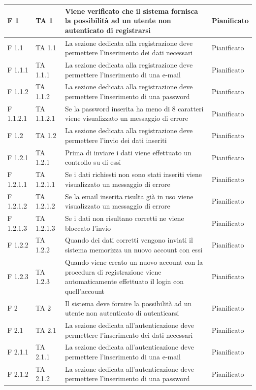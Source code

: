 \documentclass[a4paper,11pt]{article}
\begin{document}
\begin{longtable}{p{}p{}p{}p{}}
F 1 & TA 1& Viene verificato che il sistema fornisca la possibilità ad un utente non autenticato di registrarsi & Pianificato\\
\midrule
F 1.1 &TA 1.1& La sezione dedicata alla registrazione deve permettere l'inserimento dei dati necessari & Pianificato\\
\midrule
F 1.1.1 &TA 1.1.1& La sezione dedicata alla registrazione deve permettere l'inserimento di una e-mail & Pianificato\\
\midrule
F 1.1.2 &TA 1.1.2& La sezione dedicata alla registrazione deve permettere l'inserimento di una password & Pianificato\\
\midrule
F 1.1.2.1 &TA 1.1.2.1& Se la password inserita ha meno di 8 caratteri viene visualizzato un messaggio di errore & Pianificato\\
\midrule
F 1.2 & TA 1.2&La sezione dedicata alla registrazione deve permettere l'invio dei dati inseriti & Pianificato\\
\midrule
F 1.2.1 &TA 1.2.1&Prima di inviare i dati viene effettuato un controllo su di essi & Pianificato\\
\midrule
F 1.2.1.1 & TA 1.2.1.1&Se i dati richiesti non sono stati inseriti viene visualizzato un messaggio di errore & Pianificato\\
\midrule
F 1.2.1.2 &TA 1.2.1.2&Se la email inserita risulta già in uso viene visualizzato un messaggio di errore & Pianificato\\
\midrule
F 1.2.1.3 & TA 1.2.1.3&Se i dati non risultano corretti ne viene bloccato l'invio & Pianificato\\
\midrule
F 1.2.2 & TA 1.2.2&Quando dei dati corretti vengono inviati il sistema memorizza un nuovo account con essi & Pianificato\\
\midrule
F 1.2.3 & TA 1.2.3&Quando viene creato un nuovo account con la procedura di registrazione viene automaticamente effettuato il login con quell'account & Pianificato\\
\midrule
F 2 & TA 2&Il sistema deve fornire la possibilità ad un utente non autenticato di autenticarsi & Pianificato\\
\midrule
F 2.1 &TA 2.1 & La sezione dedicata all'autenticazione deve permettere l'inserimento dei dati necessari & Pianificato\\
\midrule
F 2.1.1 &TA 2.1.1&La sezione dedicata all'autenticazione deve permettere l'inserimento di una e-mail & Pianificato\\
\midrule
F 2.1.2 &TA 2.1.2&La sezione dedicata all'autenticazione deve permettere l'inserimento di una password & Pianificato\\

\end{longtable}
\end{document}
